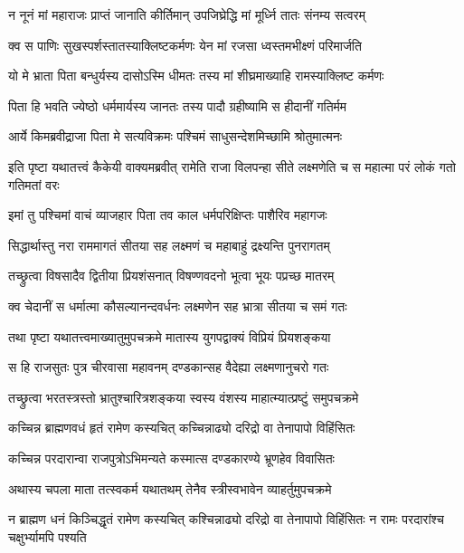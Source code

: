 \twolineshloka
{न नूनं मां महाराजः प्राप्तं जानाति कीर्तिमान्}
{उपजिघ्रेद्धि मां मूर्ध्नि तातः संनम्य सत्वरम्} %

\twolineshloka
{क्व स पाणिः सुखस्पर्शस्तातस्याक्लिष्टकर्मणः}
{येन मां रजसा ध्वस्तमभीक्ष्णं परिमार्जति} %

\twolineshloka
{यो मे भ्राता पिता बन्धुर्यस्य दासोऽस्मि धीमतः}
{तस्य मां शीघ्रमाख्याहि रामस्याक्लिष्ट कर्मणः} %

\twolineshloka
{पिता हि भवति ज्येष्ठो धर्ममार्यस्य जानतः}
{तस्य पादौ ग्रहीष्यामि स हीदानीं गतिर्मम} %

\twolineshloka
{आर्ये किमब्रवीद्राजा पिता मे सत्यविक्रमः}
{पश्चिमं साधुसन्देशमिच्छामि श्रोतुमात्मनः} %

\threelineshloka
{इति पृष्टा यथातत्त्वं कैकेयी वाक्यमब्रवीत्}
{रामेति राजा विलपन्हा सीते लक्ष्मणेति च}
{स महात्मा परं लोकं गतो गतिमतां वरः} %

\twolineshloka
{इमां तु पश्चिमां वाचं व्याजहार पिता तव}
{काल धर्मपरिक्षिप्तः पाशैरिव महागजः} %

\twolineshloka
{सिद्धार्थास्तु नरा राममागतं सीतया सह}
{लक्ष्मणं च महाबाहुं द्रक्ष्यन्ति पुनरागतम्} %

\twolineshloka
{तच्छ्रुत्वा विषसादैव द्वितीया प्रियशंसनात्}
{विषण्णवदनो भूत्वा भूयः पप्रच्छ मातरम्} %

\twolineshloka
{क्व चेदानीं स धर्मात्मा कौसल्यानन्दवर्धनः}
{लक्ष्मणेन सह भ्रात्रा सीतया च समं गतः} %

\twolineshloka
{तथा पृष्टा यथातत्त्वमाख्यातुमुपचक्रमे}
{मातास्य युगपद्वाक्यं विप्रियं प्रियशङ्कया} %

\twolineshloka
{स हि राजसुतः पुत्र चीरवासा महावनम्}
{दण्डकान्सह वैदेह्या लक्ष्मणानुचरो गतः} %

\twolineshloka
{तच्छ्रुत्वा भरतस्त्रस्तो भ्रातुश्चारित्रशङ्कया}
{स्वस्य वंशस्य माहात्म्यात्प्रष्टुं समुपचक्रमे} %

\twolineshloka
{कच्चिन्न ब्राह्मणवधं हृतं रामेण कस्यचित्}
{कच्चिन्नाढ्यो दरिद्रो वा तेनापापो विहिंसितः} %

\twolineshloka
{कच्चिन्न परदारान्वा राजपुत्रोऽभिमन्यते}
{कस्मात्स दण्डकारण्ये भ्रूणहेव विवासितः} %

\twolineshloka
{अथास्य चपला माता तत्स्वकर्म यथातथम्}
{तेनैव स्त्रीस्वभावेन व्याहर्तुमुपचक्रमे} %

\threelineshloka
{न ब्राह्मण धनं किञ्चिद्धृतं रामेण कस्यचित्}
{कश्चिन्नाढ्यो दरिद्रो वा तेनापापो विहिंसितः}
{न रामः परदारांश्च चक्षुर्भ्यामपि पश्यति} %

